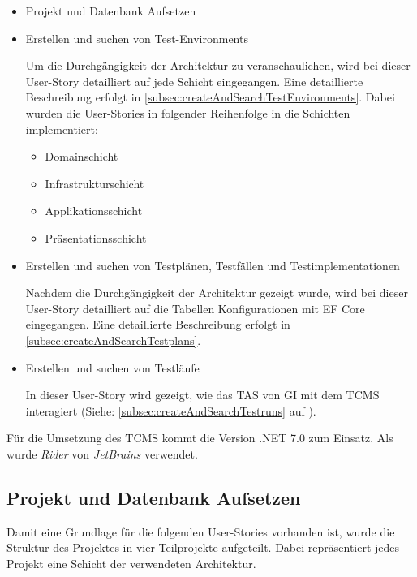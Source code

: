 \documentclass[a4paper, fontsize=11pt, parskip=half, twoside]{scrreprt}
\begin{document}
	\begin{itemize}
		\item Projekt und Datenbank Aufsetzen
		\item Erstellen und suchen von Test-Environments
		
		Um die Durchgängigkeit der Architektur zu veranschaulichen, wird bei dieser User-Story detailliert auf jede Schicht eingegangen.
		Eine detaillierte Beschreibung erfolgt in \autoref{subsec:createAndSearchTestEnvironments}.
		Dabei wurden die User-Stories in folgender Reihenfolge in die Schichten implementiert:
		
		\begin{itemize}
			\setlength\itemsep{-0.5em}
			\item Domainschicht
			\item Infrastrukturschicht
			\item Applikationsschicht
			\item Präsentationsschicht
		\end{itemize}
	
		\item Erstellen und suchen von Testplänen, Testfällen und Testimplementationen
		
		Nachdem die Durchgängigkeit der Architektur gezeigt wurde, wird bei dieser User-Story detailliert auf die Tabellen Konfigurationen mit \ac{EF} Core eingegangen. 
		Eine detaillierte Beschreibung erfolgt in \autoref{subsec:createAndSearchTestplans}.
		
		\item Erstellen und suchen von Testläufe
		
		In dieser User-Story wird gezeigt, wie das \ac{TAS} von \ac{GI} mit dem \ac{TCMS} interagiert (Siehe: \autoref{subsec:createAndSearchTestruns} auf ).
	\end{itemize}

	Für die Umsetzung des \ac{TCMS} kommt die Version .NET 7.0 zum Einsatz.
	Als  wurde \emph{Rider} von \emph{JetBrains} verwendet.


	\subsection{Projekt und Datenbank Aufsetzen}
	Damit eine Grundlage für die folgenden User-Stories vorhanden ist, wurde die Struktur des Projektes in vier Teilprojekte aufgeteilt.
	Dabei repräsentiert jedes Projekt eine Schicht der verwendeten Architektur.
	
\end{document}
